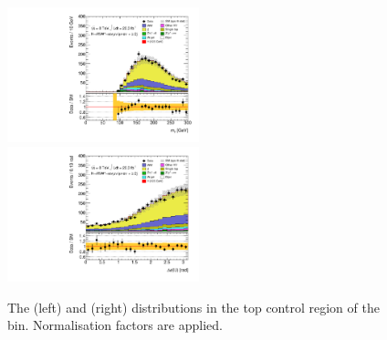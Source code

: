 \begin{figure}[t]
	\includegraphics[width=0.495\textwidth]{tex/backgrounds/emme_CutFailVBFHighMllTopCR_2jetincl_MT_TrackHWW_Clj_mh125_lin}
	\hfill
	\includegraphics[width=0.495\textwidth]{tex/backgrounds/emme_CutFailVBFHighMllTopCR_2jetincl_DPhill_mh125_lin}
	\caption{The \mt (left) and \dphill (right) distributions in the top control region of 
	the \twojet bin. Normalisation factors are applied.}
	\label{fig:top:2j}
\end{figure}

